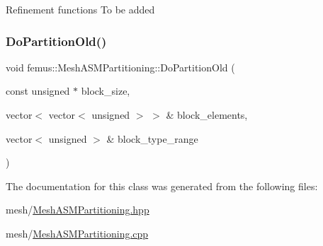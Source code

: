 Refinement functions To be added \mbox{\label{classfemus_1_1_mesh_a_s_m_partitioning_a7634351749a07b26f70877a1e4388173}} 
\subsubsection{\texorpdfstring{Do\+Partition\+Old()}{DoPartitionOld()}}
{\footnotesize\ttfamily void femus\+::\+Mesh\+A\+S\+M\+Partitioning\+::\+Do\+Partition\+Old (\begin{DoxyParamCaption}\item[{const unsigned $\ast$}]{block\+\_\+size,  }\item[{vector$<$ vector$<$ unsigned $>$ $>$ \&}]{block\+\_\+elements,  }\item[{vector$<$ unsigned $>$ \&}]{block\+\_\+type\+\_\+range }\end{DoxyParamCaption})}



The documentation for this class was generated from the following files\+:\begin{DoxyCompactItemize}
\item 
mesh/\mbox{\hyperlink{_mesh_a_s_m_partitioning_8hpp}{Mesh\+A\+S\+M\+Partitioning.\+hpp}}\item 
mesh/\mbox{\hyperlink{_mesh_a_s_m_partitioning_8cpp}{Mesh\+A\+S\+M\+Partitioning.\+cpp}}\end{DoxyCompactItemize}
